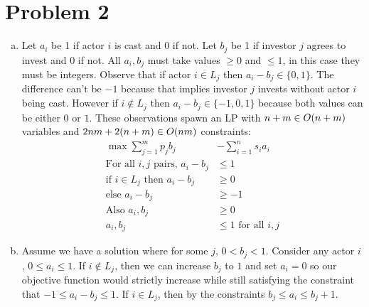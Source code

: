 \documentclass[11pt]{article}
\let\origleft\left
\let\origright\right
\renewcommand{\left}{\mathopen{}\mathclose\bgroup\origleft}
\renewcommand{\right}{\aftergroup\egroup\origright}
\newcommand{\p}[1]{\left(#1\right)}
\newcommand{\BigOh}[1]{O\p{#1}}
\begin{document}
\section*{Problem 2}
\begin{enumerate}[a)]
\item Let $a_i$ be 1 if actor $i$ is cast and 0 if not. Let $b_j$ be 1 if investor $j$ agrees to invest and 0 if not. All $a_i,b_j$ must take values $\geq 0$ and $\leq 1$, in this case they must be integers. Observe that if actor $i\in L_j$ then $a_i-b_j\in \{0,1\}$. The difference can't be $-1$ because that implies investor $j$ invests without actor $i$ being cast. However if $i\notin L_j$ then $a_i-b_j\in \{-1,0,1\}$ because both values can be either $0$ or $1$. These observations spawn an LP with $n+m\in \BigOh{n+m}$ variables and $2nm+2(n+m)\in \BigOh{nm}$ constraints:
\begin{align*}
\max \sum_{j=1}^m p_jb_j &- \sum_{i=1}^n s_ia_i \\
\text{For all }i,j\text{ pairs, }a_i-b_j &\leq 1 \\
\text{if }i\in L_j\text{ then }a_i-b_j &\geq 0 \\
\text{else }a_i-b_j &\geq -1 \\
\text{Also }a_i,b_j &\geq 0 \\
a_i,b_j &\leq 1 \text{ for all }i,j
\end{align*}
\item Assume we have a solution where for some $j$, $0<b_j<1$. Consider any actor $i$, $0\leq a_i \leq 1$. If $i\notin L_j$, then we can increase $b_j$ to $1$ and set $a_i=0$ so our objective function would strictly increase while still satisfying the constraint that $-1\leq a_i-b_j \leq 1$. If $i\in L_j$, then by the constraints $b_j \leq a_i \leq b_j+1$.
\end{enumerate}

\newpage
\end{document}
